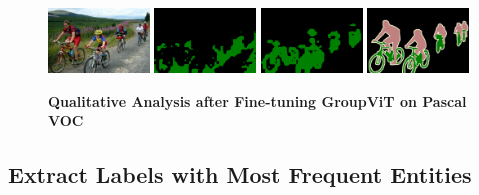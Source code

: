 \begin{figure}[t]
  {\includegraphics[width=0.24\textwidth]{figures/experiments/pascal/image/0039.jpg}}
  {\includegraphics[width=0.24\textwidth]{figures/experiments/pascal/orgckpt/0039.png}}
  {\includegraphics[width=0.24\textwidth]{figures/experiments/pascal/ft/0039.png}}
  {\includegraphics[width=0.24\textwidth]{figures/experiments/pascal/gt/2007_001311.png}}
\caption[\textbf{Qualitative Analysis after Fine-tuning on Pascal VOC}]{\textbf{Qualitative Analysis after Fine-tuning GroupViT on Pascal VOC}}
\label{fig:qualitative_refined}

\end{figure}


\subsection{Extract Labels with Most Frequent Entities}

